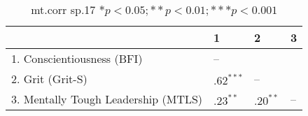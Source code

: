 \begin{table}[ht]
\centering
\begin{tabular}{llll}
  \hline
 & 1 & 2 & 3 \\ 
  \hline
1. Conscientiousness (BFI) & -- &  &  \\ 
  2. Grit (Grit-S) & $.62^{***}$ & -- &  \\ 
  3. Mentally Tough Leadership (MTLS) & $.23^{**}$ & $.20^{**}$ & -- \\ 
   \hline
\end{tabular}
\caption{mt.corr sp.17 $* p < 0.05; ** p < 0.01; *** p < 0.001$} 
\label{freq_corr.mt.corr.sp.17}
\end{table}
